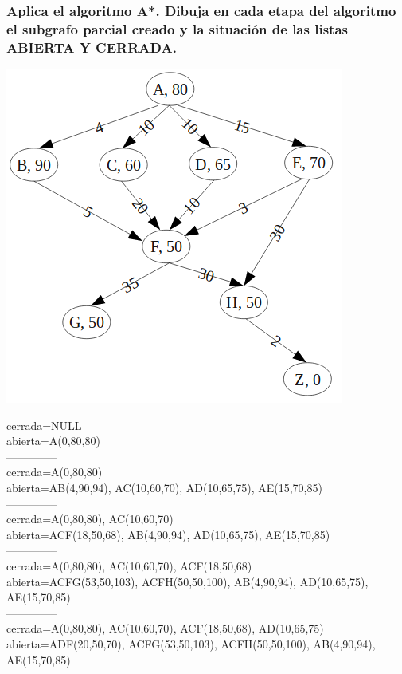 \documentclass[a4paper,10pt]{article}
\begin{document}
\subsubsection{Aplica el algoritmo A*. Dibuja en cada etapa del algoritmo el subgrafo parcial creado y la situación de las listas ABIERTA Y CERRADA.}
\vspace{0.5cm}
\centering
\includegraphics[scale=0.8]{grafo.png}\\
\raggedright
\vspace{1cm}
cerrada=NULL\\
abierta=A(0,80,80)\\
--------------\\
cerrada=A(0,80,80)\\
abierta=AB(4,90,94), AC(10,60,70), AD(10,65,75), AE(15,70,85)\\
--------------\\
cerrada=A(0,80,80), AC(10,60,70)\\
abierta=ACF(18,50,68), AB(4,90,94), AD(10,65,75), AE(15,70,85)\\
--------------\\
cerrada=A(0,80,80), AC(10,60,70), ACF(18,50,68)\\
abierta=ACFG(53,50,103), ACFH(50,50,100), AB(4,90,94), AD(10,65,75), AE(15,70,85)\\
--------------\\
cerrada=A(0,80,80), AC(10,60,70), ACF(18,50,68), AD(10,65,75)\\
abierta=ADF(20,50,70), ACFG(53,50,103), ACFH(50,50,100), AB(4,90,94), AE(15,70,85)\\
\end{document}
